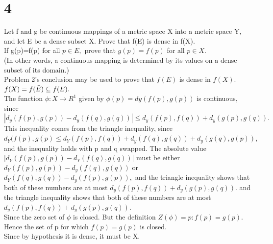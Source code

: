 \section*{4}
Let f and g be continuous mappings of a metric space X into a metric space Y, and let E be a dense subset X. Prove that f(E) is dense in f(X). \\ 
If g(p)=f(p) for all $p \in E,$ prove that $g(p)=f(p)$ for all $p \in X.$ \\ 
(In other words, a continuous mapping is determined by its values on a dense subset of its domain.)\\ 
Problem 2's conclusion may be used to prove that $f(E)$ is dense in $f(X).$ \\ 
$f(X)=f(\Bar{E}) \subseteq \Bar{f(E)}.$ \\ 
The function $\phi : X \longrightarrow R^1$ given by $\phi (p) =dy(f(p),g(p))$ is continuous, since $|d_y(f(p),g(p))-d_y(f(q),g(q))| \leq d_y(f(p),f(q))+d_y(g(p),g(q)).$ \\ 
This inequality comes from the triangle inequality, since $d_Y(f(p),g(p) \leq d_Y(f(p),f(q))+d_y(f(q),g(q))+d_y(g(q),g(p)),$ and the inequality holds with p and q swapped. The absolute value $|d_Y(f(p),g(p))-d_Y(f(q),g(q))|$ must be either $d_Y(f(p),g(p))-d_y(f(q),g(q))$ or $d_Y(f(q),g(q))-d_y(f(p),g(p)),$ and the triangle inequality shows that both of these numbers are at most $d_y(f(p),f(q))+d_y(g(p),g(q)).$ and the triangle inequality shows that both of these numbers are at most $d_y(f(p),f(q))+d_y(g(p),g(q)).$ \\ 
Since the zero set of $\phi$ is closed. But the definition $Z(\phi)={p: f(p)=g(p)}$. \\ 
Hence the set of p for which $f(p)=g(p)$ is closed. \\ 
Since by hypothesis it is dense, it must be X. 

